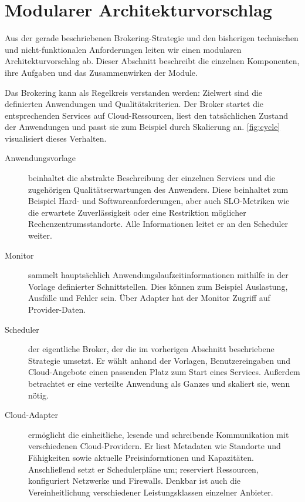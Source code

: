 \section{Modularer Architekturvorschlag}
\label{sec:architektur}

Aus der gerade beschriebenen Brokering-Strategie und den bisherigen technischen und nicht-funktionalen Anforderungen leiten wir einen modularen Architekturvorschlag ab. Dieser Abschnitt beschreibt die einzelnen Komponenten, ihre Aufgaben und das Zusammenwirken der Module. 

Das Brokering kann als Regelkreis verstanden werden: Zielwert sind die definierten Anwendungen und Qualitätskriterien. Der Broker startet die entsprechenden Services auf Cloud-Ressourcen, liest den tatsächlichen Zustand der Anwendungen und passt sie zum Beispiel durch Skalierung an. \autoref{fig:cycle} visualisiert dieses Verhalten.

\begin{description}
	
	\item[Anwendungsvorlage] beinhaltet die abstrakte Beschreibung der einzelnen Services und die zugehörigen Qualitätserwartungen des Anwenders. Diese beinhaltet zum Beispiel Hard- und Softwareanforderungen, aber auch SLO-Metriken wie die erwartete Zuverlässigkeit oder eine Restriktion möglicher Rechenzentrumsstandorte. Alle Informationen leitet er an den Scheduler weiter.	
	
	\item[Monitor] sammelt hauptsächlich Anwendungslaufzeitinformationen mithilfe in der Vorlage definierter Schnittstellen. Dies können zum Beispiel Auslastung, Ausfälle und Fehler sein. Über Adapter hat der Monitor Zugriff auf Provider-Daten.	
	
	\item[Scheduler] der eigentliche Broker, der die im vorherigen Abschnitt beschriebene Strategie umsetzt. Er wählt anhand der Vorlagen, Benutzereingaben und Cloud-Angebote einen passenden Platz zum Start eines Services. Außerdem betrachtet er eine verteilte Anwendung als Ganzes und skaliert sie, wenn nötig.	
	
	\item[Cloud-Adapter] ermöglicht die einheitliche, lesende und schreibende Kommunikation mit verschiedenen Cloud-Providern. Er liest Metadaten wie Standorte und Fähigkeiten sowie aktuelle Preisinformtionen und Kapazitäten. Anschließend setzt er Schedulerpläne um; reserviert Ressourcen, konfiguriert Netzwerke und Firewalls. Denkbar ist auch die Vereinheitlichung verschiedener Leistungsklassen einzelner Anbieter.
	
\end{description}

